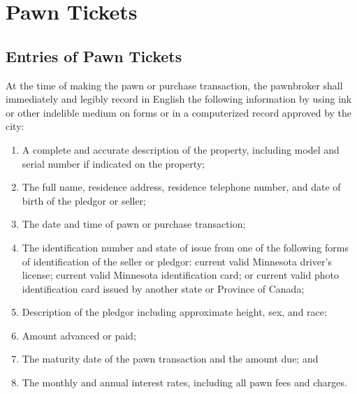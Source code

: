 \section{Pawn Tickets}
\subsection{Entries of Pawn Tickets}
At the time of making the pawn or purchase transaction, the pawnbroker shall immediately and legibly record in English the following information by using ink or other indelible medium on forms or in a computerized record approved by the city:
\begin{enumerate}[{\indent}1)]
    \item A complete and accurate description of the property, including model and serial number if indicated on the property;
    \item The full name, residence address, residence telephone number, and date of birth of the pledgor or seller;
    \item The date and time of pawn or purchase transaction;
    \item The identification number and state of issue from one of the following forms of identification of the seller or pledgor: current valid Minnesota driver’s license; current valid Minnesota identification card; or current valid photo identification card issued by another state or Province of Canada;
    \item Description of the pledgor including approximate height, sex, and race;
    \item Amount advanced or paid;
    \item The maturity date of the pawn transaction and the amount due; and
    \item The monthly and annual interest rates, including all pawn fees and charges.
\end{enumerate}
